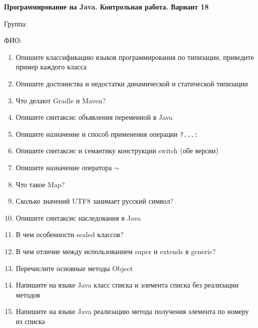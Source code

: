 \documentclass[12pt]{article}
\begin{document}
\newpage\begin{minipage}{\textwidth}
\textbf{Программирование на Java. Контрольная работа. Вариант 18}

Группа: \underline{\hspace{3cm}}

ФИО: \underline{\hspace{10cm}}

\begin{enumerate}
\item Опишите классификацию языков программирования по типизации, приведите пример каждого класса
\item Опишите достоинства и недостатки динамической и статической типизации
\item Что делают Gradle и Maven?
\item Опишите синтаксис объявления переменной в Java
\item Опишите назначение и способ применения операции \verb|?...:|
\item Опишите синтаксис и семантику конструкции switch (обе версии)
\item Опишите назначение оператора $\sim$
\item Что такое Map?
\item Сколько значений UTF8 занимает русский символ?
\item Опишите синтаксис наследования в Java
\item В чем особенности sealed классов?
\item В чем отличие между использованием super и extends в generic?
\item Перечислите основные методы Object
\item Напишите на языке Java класс списка и элемента списка без реализации методов
\item Напишите на языке Java реализацию метода получения элемента по номеру из списка

\end{enumerate}
\end{minipage}
\end{document}
